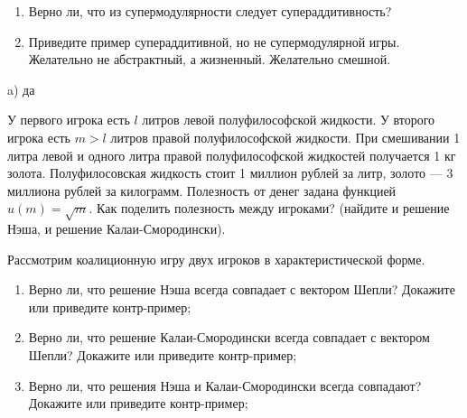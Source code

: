 \begin{problem}

\begin{enumerate}

\item Верно ли, что из супермодулярности следует супераддитивность?

\item Приведите пример супераддитивной, но не супермодулярной игры. Желательно не абстрактный, а жизненный. Желательно смешной.
\end{enumerate}


\begin{sol}
\begin{enumerate}
a) да
\end{enumerate}
\end{sol}
\end{problem}





\begin{problem}
 У первого игрока есть $l$ литров левой полуфилософской
жидкости. У второго игрока есть $m>l$ литров правой полуфилософской
жидкости. При смешивании 1 литра левой и одного литра правой полуфилософской
жидкостей получается 1 кг золота. Полуфилосовская жидкость стоит 1 миллион
рублей за литр, золото — 3 миллиона рублей за килограмм. Полезность от денег
задана функцией $u(m)=\sqrt{m}$. Как поделить полезность между игроками?
(найдите и решение Нэша, и решение Калаи-Смородински).



\begin{sol}

\end{sol}
\end{problem}



\begin{problem}

 Рассмотрим коалиционную игру двух игроков в характеристической
форме.

\begin{enumerate}
\item Верно ли, что решение Нэша всегда совпадает с вектором Шепли? Докажите
или приведите контр-пример;

\item Верно ли, что решение Калаи-Смородински всегда совпадает с вектором
Шепли? Докажите или приведите контр-пример;

\item Верно ли, что решения Нэша и Калаи-Смородински всегда совпадают? Докажите
или приведите контр-пример;
\end{enumerate}



\begin{sol}

\end{sol}
\end{problem}



